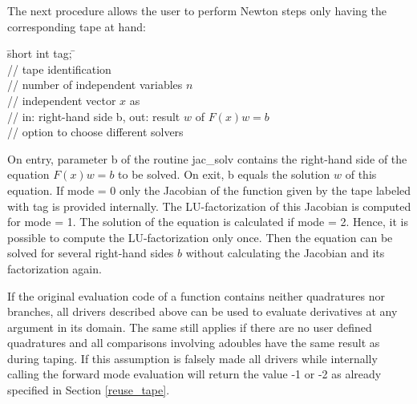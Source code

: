 \documentclass[11pt,twoside]{article}
\begin{document}
%
The next procedure allows the user to perform Newton steps only 
having the corresponding tape at hand: 
%
\begin{tabbing}
\hspace{0.5in}\={\sf short int tag;} \hspace{1.1in}\= \kill    %
 \\
         \> // tape identification \\
                 \> // number of independent variables $n$\\
           \> // independent vector $x$ as\\
           \> // in: right-hand side b, out: result $w$ of
$F(x)w = b$\\
              \> // option to choose different solvers
\end{tabbing}
%
On entry, parameter {\sf b} of the routine {\sf jac\_solv}
contains the right-hand side of the equation $F(x)w = b$ to be solved. On exit, 
{\sf b} equals the solution $w$ of this equation. If {\sf mode} = 0 only 
the Jacobian of the function
given by the tape labeled with {\sf tag} is provided internally.
The LU-factorization of this Jacobian is computed for {\sf mode} = 1. The 
solution of the equation is calculated if {\sf mode} = 2.
Hence, it is possible to compute the 
LU-factorization only once. Then the equation can be solved for several
right-hand sides $b$ without calculating the Jacobian and
its factorization again.  

If the original evaluation code of a function contains neither
quadratures nor branches, all drivers described above can be used to
evaluate derivatives at any argument in its domain. The same still 
applies if there are no user defined quadratures and
all comparisons  involving {\sf adouble}s have the same result as
during taping. If this assumption is falsely made all drivers
while internally calling the forward mode evaluation will return the value -1 or -2 
as already specified in Section \ref{reuse_tape}.  
%
\end{document}
